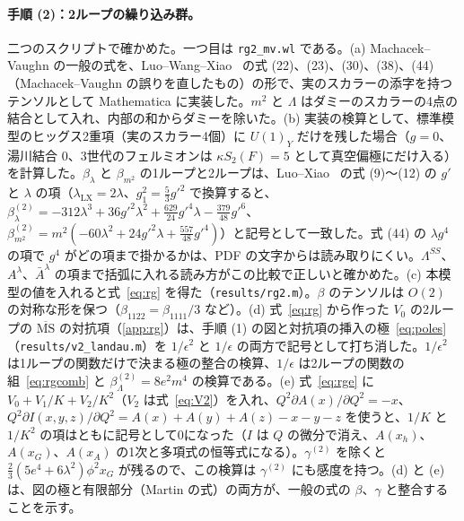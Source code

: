 \documentclass[a4paper,10pt]{ltjsarticle}
\newcommand{\MSbar}{\overline{\mathrm{MS}}}
\begin{document}
\paragraph{手順 (2)：2ループの繰り込み群。}二つのスクリプトで確かめた。一つ目は \texttt{rg2\_mv.wl} である。(a) Machacek--Vaughn の一般の式を、Luo--Wang--Xiao~\cite{lwx03} の式 (22)、(23)、(30)、(38)、(44)（Machacek--Vaughn の誤りを直したもの）の形で、実のスカラーの添字を持つテンソルとして Mathematica に実装した。$m^2$ と $\Lambda$ はダミーのスカラーの4点の結合として入れ、内部の和からダミーを除いた。(b) 実装の検算として、標準模型のヒッグス2重項（実のスカラー4個）に $U(1)_Y$ だけを残した場合（$g=0$、湯川結合 0、3世代のフェルミオンは $\kappa S_2(F)=5$ として真空偏極にだけ入る）を計算した。$\beta_\lambda$ と $\beta_{m^2}$ の1ループと2ループは、Luo--Xiao~\cite{lx03} の式 (9)〜(12) の $g'$ と $\lambda$ の項（$\lambda_{\mathrm{LX}}=2\lambda$、$g_1^2=\frac53g'^2$ で換算すると、$\beta_\lambda^{(2)}=-312\lambda^3+36g'^2\lambda^2+\frac{629}{24}g'^4\lambda-\frac{379}{48}g'^6$、$\beta_{m^2}^{(2)}=m^2(-60\lambda^2+24g'^2\lambda+\frac{557}{48}g'^4)$）と記号として一致した。式 (44) の $\lambda g^4$ の項で $g^4$ がどの項まで掛かるかは、PDF の文字からは読み取りにくい。$\Lambda^{SS}$、$A^\lambda$、$\bar A^\lambda$ の項まで括弧に入れる読み方がこの比較で正しいと確かめた。(c) 本模型の値を入れると式~\eqref{eq:rg} を得た（\texttt{results/rg2.m}）。$\beta$ のテンソルは $O(2)$ の対称な形を保つ（$\beta_{1122}=\beta_{1111}/3$ など）。(d) 式~\eqref{eq:rg} から作った $V_0$ の2ループの $\MSbar$ の対抗項（\ref{app:rg}）は、手順 (1) の図と対抗項の挿入の極~\eqref{eq:poles}（\texttt{results/v2\_landau.m}）を $1/\epsilon^2$ と $1/\epsilon$ の両方で記号として打ち消した。$1/\epsilon^2$ は1ループの関数だけで決まる極の整合の検算、$1/\epsilon$ は2ループの関数の組~\eqref{eq:rgcomb} と $\beta_\Lambda^{(2)}=8e^2m^4$ の検算である。(e) 式~\eqref{eq:rge} に $V_0+V_1/K+V_2/K^2$（$V_2$ は式~\eqref{eq:V2}）を入れ、$Q^2\partial A(x)/\partial Q^2=-x$、$Q^2\partial I(x,y,z)/\partial Q^2=A(x)+A(y)+A(z)-x-y-z$ を使うと、$1/K$ と $1/K^2$ の項はともに記号として0になった（$I$ は $Q$ の微分で消え、$A(x_h)$、$A(x_G)$、$A(x_A)$ の1次と多項式の恒等式になる）。$\gamma^{(2)}$ を除くと $\frac23(5e^4+6\lambda^2)\phi^2x_G$ が残るので、この検算は $\gamma^{(2)}$ にも感度を持つ。(d) と (e) は、図の極と有限部分（Martin の式）の両方が、一般の式の $\beta$、$\gamma$ と整合することを示す。
\end{document}
